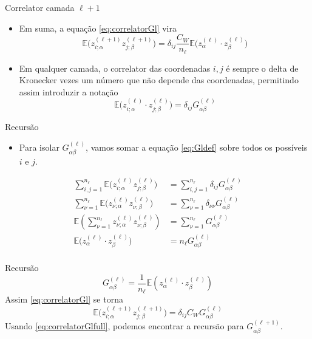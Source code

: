 \documentclass{beamer}
\newcommand{\EE}{\mathbb{E}}
\newcommand{\aaA}{\alpha}
\newcommand{\aaB}{\beta}
\def\eell{{(\ell)}}
\def\eellum{{(\ell+1)}}
\begin{document}
\begin{frame}{Correlator camada $\ell +1$}
	\begin{itemize}
		\item Em suma, a equação \eqref{eq:correlatorGl} vira 
		 \begin{equation*}
			\EE\big(z^\eellum_{i;\aaA} z^\eellum_{j;\aaB}\big) = \delta_{ij}\frac{C_W}{n_\ell} \EE\big(z^\eell_{\aaA}\cdot  z^\eell_{\aaB}\big)\tag{3.11}
		 \end{equation*}
		 \item Em qualquer camada, o correlator das coordenadas $i,j$ é sempre o delta de Kronecker vezes um número que não depende das coordenadas, permitindo assim introduzir a notação 
		 \begin{equation*}\tag{3.12}\label{eq:Gldef}
			\EE\big(z^\eell_{i;\aaA}\cdot z^\eell_{j;\aaB}\big) = \delta_{ij} G^\eell_{\aaA\aaB}  
		 \end{equation*}
	\end{itemize}
\end{frame}

\begin{frame}{Recursão}
	\begin{itemize}
		\item Para isolar $G^\eell_{\aaA\aaB}$, vamos somar a equação \eqref{eq:Gldef} sobre todos os possíveis $i$ e $j$.
	\end{itemize}
	\begin{align*}
		\sum_{i,j=1}^{n_\ell} \EE\big(z^\eell_{i;\aaA} z^\eell_{j;\aaB}\big) &= \sum_{i,j=1}^{n_\ell} \delta_{ij} G^\eell_{\aaA\aaB} \\
		\sum_{\nu=1}^{n_\ell} \EE\big(z^\eell_{\nu;\aaA} z^\eell_{\nu;\aaB}\big) &= \sum_{\nu=1}^{n_\ell} \delta_{\nu\nu}G^\eell_{\aaA\aaB} \\
		\EE\left(\sum_{\nu=1}^{n_\ell}z^\eell_{\nu;\aaA} z^\eell_{\nu;\aaB}\right) &= \sum_{\nu=1}^{n_\ell} G^\eell_{\aaA\aaB} \\
		\EE\big(z^\eell_{\aaA}\cdot z^\eell_{\aaB}\big) &= n_\ell G^\eell_{\aaA\aaB} \\
	\end{align*}
\end{frame}

\begin{frame}{Recursão}
	\begin{equation*}\tag{3.13}\label{eq:Gl}
		G^\eell_{\aaA\aaB} = \frac{1}{n_\ell}\EE(z^\eell_{\aaA}\cdot z^\eell_{\aaB})		
	\end{equation*}
	Assim \eqref{eq:correlatorGl} se torna
	\begin{equation*}\tag{3.11'}\label{eq:correlatorGlfull}
		\EE\big(z^\eellum_{i;\aaA} z^\eellum_{j;\aaB}\big) = \delta_{ij}C_WG^\eell_{\aaA\aaB}
	\end{equation*}
	Usando \eqref{eq:correlatorGlfull}, podemos encontrar a recursão para $G^\eellum_{\aaA\aaB}$.
\end{frame}
\end{document}
